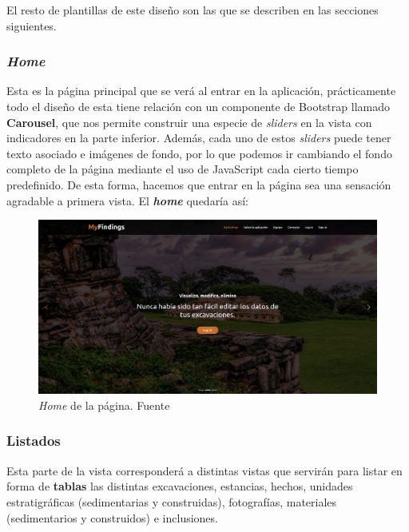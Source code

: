 El resto de plantillas de este diseño son las que se describen en las secciones siguientes.

    \subsubsection{\textit{Home}}
    Esta es la página principal que se verá al entrar en la aplicación, prácticamente todo el
    diseño de esta tiene relación con un componente de Bootstrap llamado \textbf{Carousel},
    que nos permite construir una especie de \textit{sliders} en la vista con indicadores en
    la parte inferior. Además, cada uno de estos \textit{sliders} puede tener texto asociado
    e imágenes de fondo, por lo que podemos ir cambiando el fondo completo de la página
    mediante el uso de JavaScript cada cierto tiempo predefinido. De esta forma, hacemos que
    entrar en la página sea una sensación agradable a primera vista. El \textbf{\textit{home}}
    quedaría así:
    
        \begin{figure}[H]
            \centering
            \includegraphics[scale=0.19]{imagenes/home.png}
            \caption[\textit{Home} de la página]{\textit{Home} de la página. Fuente \cite{maya}}
            \label{fig:home}
        \end{figure}

    \subsubsection{Listados}
    Esta parte de la vista corresponderá a distintas vistas que servirán para listar en forma
    de \textbf{tablas} las distintas excavaciones, estancias, hechos, unidades estratigráficas
    (sedimentarias y construidas), fotografías, materiales (sedimentarios y construidos) e
    inclusiones.\\

